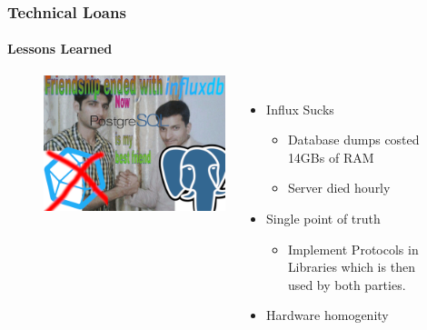 \documentclass[aspectratio=169]{beamer}
\begin{document}
\begin{frame}
  \frametitle{Technical Loans}
  \framesubtitle{Lessons Learned}

\begin{figure}
\begin{columns}
\begin{center}
\includegraphics[height=0.65\textheight]{figs/meme_postgres_influx.png}
\end{center}
\raggedright
\vspace{0.5cm}

\begin{itemize}
  \item Influx Sucks
        \begin{itemize}
          \item Database dumps costed 14GBs of RAM
          \item Server died hourly
        \end{itemize}
    \item Single point of truth
    \begin{itemize}
        \item Implement Protocols in Libraries which is then used by both parties.
    \end{itemize}
    \item Hardware homogenity
\end{itemize}
\end{columns}
\end{figure}

\end{frame}
\end{document}
